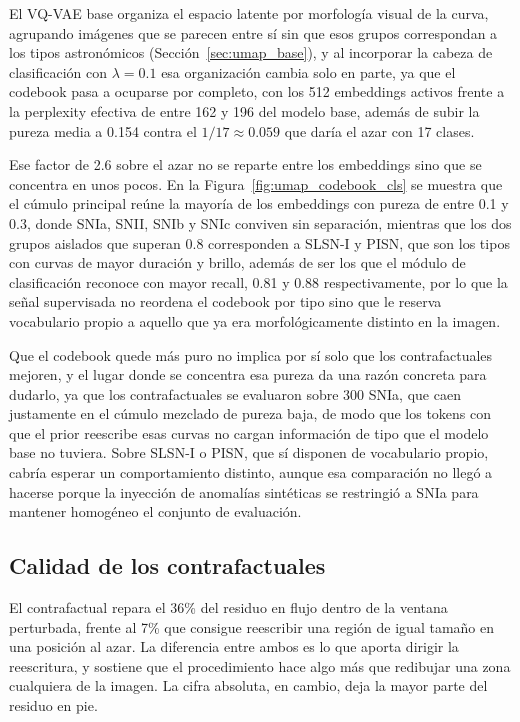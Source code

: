 El VQ-VAE base organiza el espacio latente por morfología visual de la curva, agrupando imágenes que se parecen entre sí sin que esos grupos correspondan a los tipos astronómicos (Sección~\ref{sec:umap_base}), y al incorporar la cabeza de clasificación con $\lambda = 0.1$ esa organización cambia solo en parte, ya que el codebook pasa a ocuparse por completo, con los 512 embeddings activos frente a la perplexity efectiva de entre 162 y 196 del modelo base, además de subir la pureza media a 0.154 contra el $1/17 \approx 0.059$ que daría el azar con 17 clases.

Ese factor de 2.6 sobre el azar no se reparte entre los embeddings sino que se concentra en unos pocos. En la Figura~\ref{fig:umap_codebook_cls} se muestra que el cúmulo principal reúne la mayoría de los embeddings con pureza de entre 0.1 y 0.3, donde SNIa, SNII, SNIb y SNIc conviven sin separación, mientras que los dos grupos aislados que superan 0.8 corresponden a SLSN-I y PISN, que son los tipos con curvas de mayor duración y brillo, además de ser los que el módulo de clasificación reconoce con mayor recall, 0.81 y 0.88 respectivamente, por lo que la señal supervisada no reordena el codebook por tipo sino que le reserva vocabulario propio a aquello que ya era morfológicamente distinto en la imagen.

Que el codebook quede más puro no implica por sí solo que los contrafactuales mejoren, y el lugar donde se concentra esa pureza da una razón concreta para dudarlo, ya que los contrafactuales se evaluaron sobre 300 SNIa, que caen justamente en el cúmulo mezclado de pureza baja, de modo que los tokens con que el prior reescribe esas curvas no cargan información de tipo que el modelo base no tuviera. Sobre SLSN-I o PISN, que sí disponen de vocabulario propio, cabría esperar un comportamiento distinto, aunque esa comparación no llegó a hacerse porque la inyección de anomalías sintéticas se restringió a SNIa para mantener homogéneo el conjunto de evaluación.


\subsection{Calidad de los contrafactuales}

El contrafactual repara el 36\% del residuo en flujo dentro de la ventana perturbada, frente al 7\% que consigue reescribir una región de igual tamaño en una posición al azar. La diferencia entre ambos es lo que aporta dirigir la reescritura, y sostiene que el procedimiento hace algo más que redibujar una zona cualquiera de la imagen. La cifra absoluta, en cambio, deja la mayor parte del residuo en pie.

